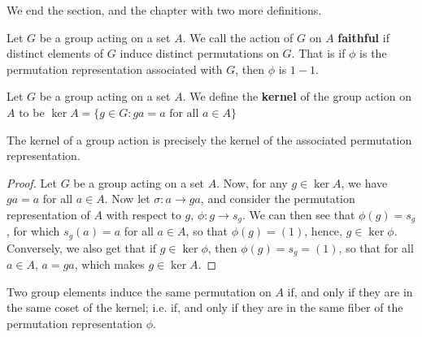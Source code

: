 We end the section, and the chapter with two more definitions.

\begin{definition}
    Let $G$ be a group acting on a set $A$. We call the action of $G$ on  $A$
     \textbf{faithful} if distinct elements of $G$ induce distinct permutations
     on  $G$. That is if $\phi$ is the permutation representation associated
     with  $G$, then  $\phi$ is  $1-1$.
\end{definition}

\begin{definition}
    Let $G$ be a group acting on a set $A$. We define the \textbf{kernel} of the
    group action on $A$ to be  $\ker{A}=\{g \in G : ga=a \text{ for all } a \in
    A\}$
\end{definition}

\begin{lemma}\label{4.1.2}
    The kernel of a group action is precisely the kernel of the associated
    permutation representation.
\end{lemma}
\begin{proof}
    Let $G$ be a group acting on a set  $A$. Now, for any  $g \in \ker{A}$, we
    have $ga=a$ for all  $a \in A$. Now let $\sigma:a \rightarrow ga$, and
    consider the permutation representation of $A$ with respect to  $g$,
    $\phi:g \rightarrow s_g$. We can then see that $\phi(g)=s_g$,
    for which $s_g(a)=a$ for all $a \in A$, so that  $\phi(g)=(1)$, hence,
    $g \in \ker{\phi}$. Conversely, we also get that if $g \in \ker{\phi}$, then
    $\phi(g)=s_g=(1)$, so that for all $a \in A$, $a=ga$, which makes  $g
    \in \ker{A}$.
\end{proof}
\begin{corollary}
    Two group elements induce the same permutation on $A$ if, and only if they
    are in the same coset of the kernel; i.e. if, and only if they are in the
    same fiber of the permutation representation $\phi$.
\end{corollary}

